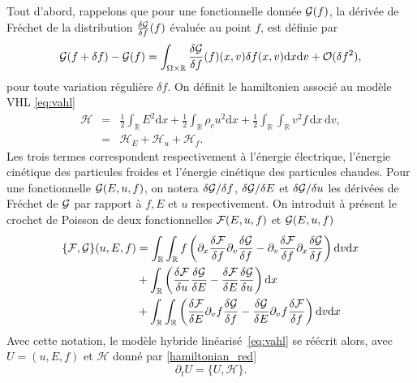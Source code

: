 Tout d'abord, rappelons que pour une fonctionnelle donnée ${\cal G}(f)$, la dérivée de Fréchet de la distribution $\frac{\delta {\cal G}}{\delta f}(f)$ évaluée au point $f$, est définie par 
\begin{equation}
  {\cal G}(f + \delta f) - {\cal G}(f) = \int_{\Omega\times \mathbb{R}} \frac{\delta {\cal G}}{\delta f}(f)(x, v) \delta f(x, v) \mathrm{d}x\mathrm{d}v +{\cal O}(\delta f^2), 
\end{equation}
pour toute variation régulière $\delta f$. On définit le hamiltonien associé au modèle VHL \eqref{eq:vahl} 
\begin{eqnarray}
\label{hamiltonian_red}
  \mathcal{H} &=& \frac{1}{2}\int_{\mathbb{R}} {E}^2 \mathrm{d}{x}  +  \frac{1}{2}\int_{\mathbb{R}} \rho_{c} u^2\mathrm{d}{x} + \frac{1}{2}\int_{\mathbb{R}}\int_{\mathbb{R}} v^2 f\,\mathrm{d}x\,\mathrm{d}v, \\
              &=&  \mathcal{H}_E + \mathcal{H}_u + \mathcal{H}_f. 
\end{eqnarray}
Les trois termes correspondent respectivement à l'énergie électrique, l'énergie cinétique des particules froides et l'énergie cinétique des particules chaudes. Pour une fonctionnelle ${\cal G}(E, u, f)$, on notera $\delta {\cal G}/\delta f$, $\delta {\cal G}/\delta E$ et $\delta {\cal G}/\delta u$ les dérivées de Fréchet de ${\cal G}$ par rapport à $f, E$ et $u$ respectivement. On introduit à présent le crochet de Poisson de deux fonctionnelles ${\cal F}(E, u, f)$ et ${\cal G}(E, u, f)$
$$
  \begin{aligned}
    \{ {\cal F}, {\cal G} \}( u, E, f) &= \int_{\mathbb{R}}\int_{\mathbb{R}} f \left( \partial_x \frac{\delta {\cal F}}{\delta f}\partial_{v} \frac{\delta {\cal G}}{\delta f} - \partial_{v} \frac{\delta {\cal F}}{\delta f}\partial_{x} \frac{\delta {\cal G}}{\delta f}\right)\mathrm{d}v \mathrm{d}x \\
                         & + \int_{\mathbb{R}}  \left(  \frac{\delta {\cal F}}{\delta{ u}}  \frac{\delta {\cal G}}{\delta{ E}} - \frac{\delta {\cal F}}{\delta{ E}}  \frac{\delta {\cal G}}{\delta{u}} \right) \mathrm{d}x \\
                         & + \int_{\mathbb{R}}\int_{\mathbb{R}}  \left(  \frac{\delta {\cal F}}{\delta{ E}}  \partial_v f\frac{\delta {\cal G}}{\delta{ f}} - \frac{\delta {\cal G}}{\delta{ E}} \partial_v f \frac{\delta {\cal F}}{\delta{f}} \right) \mathrm{d}{ v}\mathrm{d}x \\
  \end{aligned}
$$
Avec cette notation, le modèle hybride linéarisé~\eqref{eq:vahl} se réécrit alors, avec  $U=(u, E, f)$ et $\mathcal{H}$ donné par \eqref{hamiltonian_red}
\begin{equation}
\label{ham_form}
  \partial_t U = \{ U, \mathcal{H} \}. 
\end{equation}

